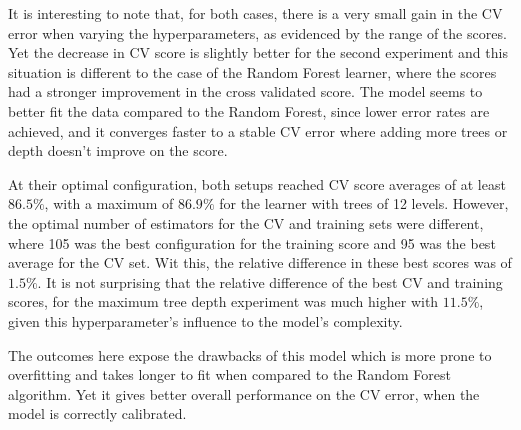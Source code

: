 It is interesting to note that, for both cases, there is a very small gain in the CV error when varying the hyperparameters, as evidenced by the range of the scores.
Yet the decrease in CV score is slightly better for the second experiment and this situation is different to the case of the Random Forest learner, where the scores had a stronger improvement in the cross validated score.
The model seems to better fit the data compared to the Random Forest, since lower error rates are achieved, and it converges faster to a stable CV error where adding more trees or depth doesn't improve on the score.

At their optimal configuration, both setups reached CV score averages of at least $86.5\%$, with a maximum of $86.9\%$ for the learner with trees of 12 levels.
However, the optimal number of estimators for the CV and training sets were different, where 105 was the best configuration for the training score and 95 was the best average for the CV set.
Wit this, the relative difference in these best scores was of $1.5\%$.
It is not surprising that the relative difference of the best CV and training scores, for the maximum tree depth experiment was much higher with $11.5\%$, given this hyperparameter's influence to the model's complexity.

The outcomes here expose the drawbacks of this model which is more prone to overfitting and takes longer to fit when compared to the Random Forest algorithm.
Yet it gives better overall performance on the CV error, when the model is correctly calibrated.



%

